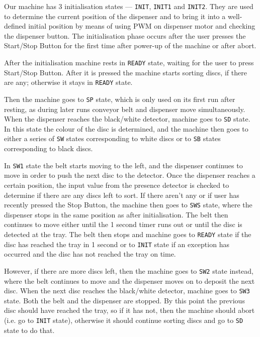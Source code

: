 \documentclass[a4paper,oneside,11pt]{report}
\begin{document}
Our machine has 3 initialisation states --- \texttt{INIT}, \texttt{INIT1} and \texttt{INIT2}. They are used to determine the current position of the dispenser and to bring it into a well-defined initial position by means of using PWM on dispenser motor and checking the dispenser button. The initialisation phase occurs after the user presses the Start/Stop Button for the first time after power-up of the machine or after abort.

After the initialisation machine rests in \texttt{READY} state, waiting for the user to press Start/Stop Button. After it is pressed the machine starts sorting discs, if there are any; otherwise it stays in \texttt{READY} state.

Then the machine goes to \texttt{SP} state, which is only used on its first run after resting, as during later runs conveyor belt and dispenser move simultaneously. When the dispenser reaches the black/white detector, machine goes to \texttt{SD} state. In this state the colour of the disc is determined, and the machine then goes to either a series of \texttt{SW} states corresponding to white discs or to \texttt{SB} states corresponding to black discs.

In \texttt{SW1} state the belt starts moving to the left, and the dispenser continues to move in order to push the next disc to the detector. Once the dispenser reaches a certain position, the input value from the presence detector is checked to determine if there are any discs left to sort. If there aren't any or if user has recently pressed the Stop Button, the machine then goes to \texttt{SWS} state, where the dispenser stops in the same position as after initialisation. The belt then continues to move either until the 1 second timer runs out or until the disc is detected at the tray. The belt then stops and machine goes to \texttt{READY} state if the disc has reached the tray in 1 second or to \texttt{INIT} state if an exception has occurred and the disc has not reached the tray on time.

However, if there are more discs left, then the machine goes to \texttt{SW2} state instead, where the belt continues to move and the dispenser moves on to deposit the next disc. When the next disc reaches the black/white detector, machine goes to \texttt{SW3} state. Both the belt and the dispenser are stopped. By this point the previous disc should have reached the tray, so if it has not, then the machine should abort (i.e. go to \texttt{INIT} state), otherwise it should continue sorting discs and go to \texttt{SD} state to do that.
\end{document}
